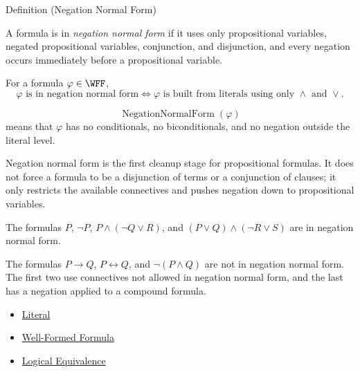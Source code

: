 \begin{definitionbox}{Definition (Negation Normal Form)}
\begin{definition}
\label{def:negation-normal-form-propositional-logic}
A formula is in \emph{negation normal form} if it uses only propositional
variables, negated propositional variables, conjunction, and disjunction, and
every negation occurs immediately before a propositional variable.
\end{definition}
\end{definitionbox}

\begin{remark*}
For a formula \(\varphi\in\WFF\),
\[
\varphi\text{ is in negation normal form}
\Longleftrightarrow
\varphi\text{ is built from literals using only }\land\text{ and }\lor.
\]
\end{remark*}

\begin{remark*}
\[
\operatorname{NegationNormalForm}(\varphi)
\]
means that \(\varphi\) has no conditionals, no biconditionals, and no negation
outside the literal level.
\end{remark*}

\begin{remark*}[Interpretation]
Negation normal form is the first cleanup stage for propositional formulas.
It does not force a formula to be a disjunction of terms or a conjunction of
clauses; it only restricts the available connectives and pushes negation down
to propositional variables.
\end{remark*}

\begin{remark*}[Examples]
The formulas \(P\), \(\neg P\), \(P\land(\neg Q\lor R)\), and
\((P\lor Q)\land(\neg R\lor S)\) are in negation normal form.
\end{remark*}

\begin{remark*}
The formulas \(P\to Q\), \(P\leftrightarrow Q\), and \(\neg(P\land Q)\) are not
in negation normal form. The first two use connectives not allowed in negation
normal form, and the last has a negation applied to a compound formula.
\end{remark*}

\begin{dependencies}
\begin{itemize}
  \item \hyperref[def:literal-propositional-logic]{Literal}
  \item \hyperref[def:well-formed-formula]{Well-Formed Formula}
  \item \hyperref[def:logical-equivalence-propositional-logic]{Logical Equivalence}
\end{itemize}
\end{dependencies}

